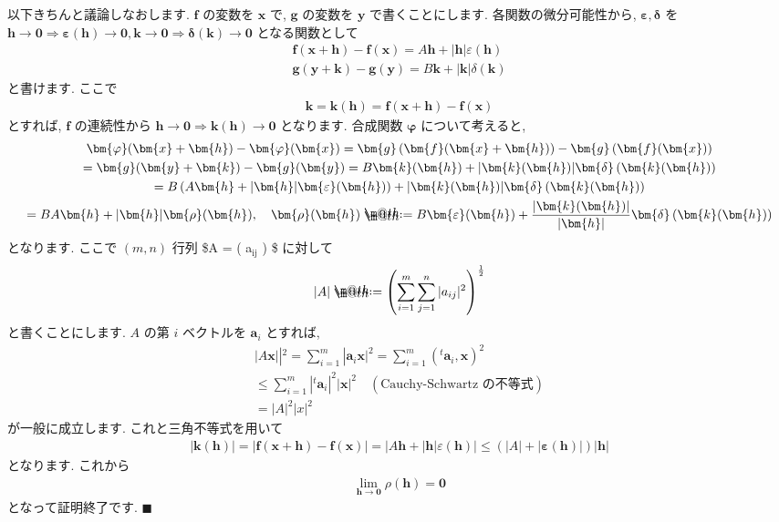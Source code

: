 \documentclass[openany, a4paper, oneside]{jsbook}
\makeatletter
\newcommand*{\defeq}{\mathrel{\rlap{%
\raisebox{0.3ex}{$\m@th\cdot$}}%
\raisebox{-0.3ex}{$\m@th\cdot$}}%
=}
\theoremstyle{break}
\theoremstyle{breakdefn}
\newcommand{\abs}[1]{\left|#1\right|}
\newcommand{\vep}{\varepsilon}
\makeatother
\begin{document}
以下きちんと議論しなおします.
$\bm{f}$ の変数を $\bm{x}$ で,  $\bm{g}$ の変数を $\bm{y}$ で書くことにします.
各関数の微分可能性から,  $\bm{ \vep}  , \bm{ \delta }$ を
$\bm{h} \to \bm{0} \Rightarrow \bm{\vep}( \bm{h} ) \to \bm{0} , \bm{k} \to \bm{0} \Rightarrow \bm{\delta} ( \bm{k} ) \to \bm{0}$
となる関数として
\begin{gather}
\bm{f} ( \bm{x} + \bm{h} ) - \bm{f} ( \bm{x} )
=
A \bm{h} + | \bm{h} | \vep ( \bm{h} ) \\
\bm{g} ( \bm{y} + \bm{k} ) - \bm{g} ( \bm{y} )
=
B \bm{k} + | \bm{k} | \delta ( \bm{k} )
\end{gather}
と書けます.
ここで
\begin{gather}
\bm{k}
=
\bm{k} ( \bm{h} )
=
\bm{f} ( \bm{x} + \bm{h} ) - \bm{f} ( \bm{x} )
\end{gather}
とすれば,  $\bm{f}$ の連続性から $\bm{h} \to \bm{0} \Rightarrow \bm{k} ( \bm{h} ) \to \bm{0}$ となります.
合成関数 $\bm{ \varphi}$ について考えると,
\begin{gather}
\bm{\varphi} ( \bm{x} + \bm{h} ) - \bm{ \varphi } (\bm{x})
=
\bm{g} \left ( \bm{f} ( \bm{x} + \bm{h} ) \right) - \bm{g} \left ( \bm{f} (\bm{x}) \right) \\
=
\bm{g} ( \bm{y} + \bm{k} ) - \bm{g} ( \bm{y} )
=
B \bm{k} ( \bm{h} ) + | \bm{k} ( \bm{h} ) | \bm{ \delta } \left ( \bm{k} ( \bm{h} ) \right) \\
=
B \left ( A \bm{h} + | \bm{h} | \bm{ \vep } ( \bm{h} ) \right)
+| \bm{k} ( \bm{h} ) | \bm{ \delta } \left ( \bm{k} ( \bm{h} ) \right) \\
=
BA \bm{h} + | \bm{h} | \bm{\rho} ( \bm{h} ), \quad
\bm{ \rho } ( \bm{h} )
\defeq
B \bm{ \vep } ( \bm{h} ) + \frac{ | \bm{k} ( \bm{h} ) | }  { | \bm{h} | } \bm{ \delta } \left ( \bm{k} (\bm{h}) \right)
\end{gather}
となります.
ここで $(m,n)$ 行列 \$A = ( a$_{\mathrm{ij}}$ ) \$ に対して
\begin{gather}
\abs{A}
\defeq
\left ( \sum_{i=1}^{m} \sum_{j=1}^{n} | a_{ij} | ^2 \right)^{ \frac{1} {2} }
\end{gather}
と書くことにします.
$A$ の第 $i$ ベクトルを $\bm{a}_i$ とすれば,
\begin{gather}
\abs{A \bm{x}}|^2
=
\sum_{i=1}^m | \bm{a}_i  \bm{x} |^2
=
\sum_{i=1}^m ( {^t} \bm{a}_i , \bm{x} ) ^2 \\
\leq
\sum_{i=1}^m |{^t} \bm{a}_i |^2 | \bm{x} |^2 \quad ( \text{Cauchy-Schwartz の不等式} ) \\
=
\abs{A}^2 \abs{x}^2
\end{gather}
が一般に成立します.
これと三角不等式を用いて
\begin{gather}
\abs{\bm{k} ( \bm{h} )}
=
\abs{\bm{f} ( \bm{x} + \bm{h} ) - \bm{f} ( \bm{x} )}
=
\abs{A \bm{h} + | \bm{h} | \vep ( \bm{h} )}
\leq
\left ( | A | + | \bm{\vep} ( \bm{h} ) | \right) | \bm{h} |
\end{gather}
となります.
これから
\begin{gather}
\lim_{\bm{h}\to \bm{0}} \rho ( \bm{h} ) = \bm{0}
\end{gather}
となって証明終了です.  $\blacksquare$
\end{document}
